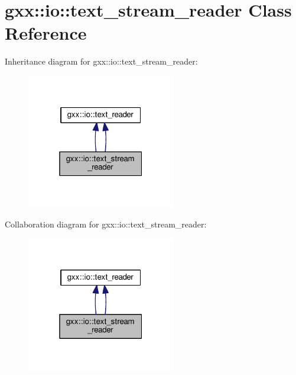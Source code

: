 \hypertarget{classgxx_1_1io_1_1text__stream__reader}{}\section{gxx\+:\+:io\+:\+:text\+\_\+stream\+\_\+reader Class Reference}
\label{classgxx_1_1io_1_1text__stream__reader}


Inheritance diagram for gxx\+:\+:io\+:\+:text\+\_\+stream\+\_\+reader\+:
\nopagebreak
\begin{figure}[H]
\begin{center}
\leavevmode
\includegraphics[width=184pt]{classgxx_1_1io_1_1text__stream__reader__inherit__graph}
\end{center}
\end{figure}


Collaboration diagram for gxx\+:\+:io\+:\+:text\+\_\+stream\+\_\+reader\+:
\nopagebreak
\begin{figure}[H]
\begin{center}
\leavevmode
\includegraphics[width=184pt]{classgxx_1_1io_1_1text__stream__reader__coll__graph}
\end{center}
\end{figure}
